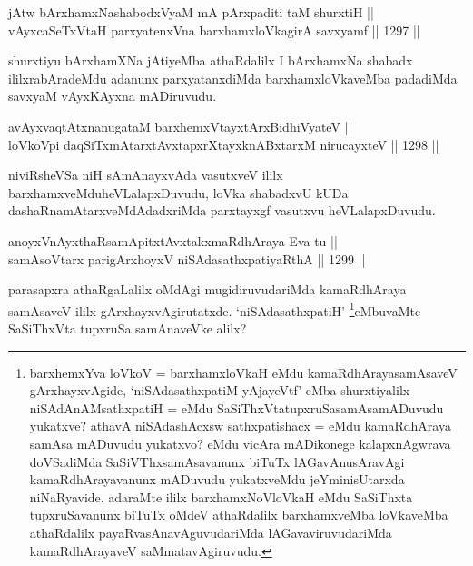 
\begin{shl}
jAtw bArxhamxNashabodxV\s yaM mA pArxpaditi taM shurxtiH || \\
vAyxcaSeTxV\s taH parxyatenxVna barxhamxloVkagirA savxyamf \hfill || 1297 ||  
\end{shl}

\begin{artha}
shurxtiyu bArxhamXNa jAtiyeMba athaRdalilx I bArxhamxNa shabadx ililxrabAradeMdu adanunx parxyatanxdiMda barxhamxloVkaveMba padadiMda savxyaM vAyxKAyxna mADiruvudu.
\end{artha}


\begin{shl}
avAyxvaqtAtxnanugataM barxhemxVtayxtArxBidhiVyateV || \\
loVkoV\s pi daqSiTxmAtarxtAvxtapxrXtayxknABxtarxM nirucayxteV \hfill || 1298 ||  
\end{shl}

\begin{artha}
niviRsheVSa niH sAmAnayxvAda vasutxveV ililx barxhamxveMduheVLalapxDuvudu, loVka shabadxvU kUDa dashaRnamAtarxveMdAdadxriMda parxtayxgf vasutxvu heVLalapxDuvudu.
\end{artha}


\begin{shl}
anoyxVnAyxthaRsamApitxtAvxtakxmaRdhAraya Eva tu || \\
samAsoV\s tarx parigArxhoyxV niSAdasathxpatiyaRthA \hfill || 1299 ||  
\end{shl}

\begin{artha}
parasapxra athaRgaLalilx oMdAgi mugidiruvudariMda kamaRdhAraya samAsaveV ililx gArxhayxvAgirutatxde. `niSAdasathxpatiH' \footnote{barxhemxYva loVkoV = barxhamxloVkaH eMdu kamaRdhArayasamAsaveV gArxhayxvAgide, `niSAdasathxpatiM yAjayeVtf' eMba shurxtiyalilx niSAdAnAMsathxpatiH = eMdu SaSiThxVtatupxruSasamAsamADuvudu yukatxve? athavA niSAdashAcxsw sathxpatishacx = eMdu kamaRdhAraya samAsa mADuvudu yukatxvo? eMdu vicAra mADikonege kalapxnAgwrava doVSadiMda SaSiVThxsamAsavanunx biTuTx lAGavAnusAravAgi kamaRdhArayavanunx mADuvudu yukatxveMdu jeYminisUtarxda niNaRyavide. adaraMte ililx barxhamxNoVloVkaH eMdu SaSiThxta tupxruSavanunx biTuTx oMdeV athaRdalilx barxhamxveMba loVkaveMba athaRdalilx payaRvasAnavAguvudariMda lAGavaviruvudariMda kamaRdhArayaveV saMmatavAgiruvudu.}eMbuvaMte SaSiThxVta tupxruSa samAnaveVke alilx?
\end{artha}

